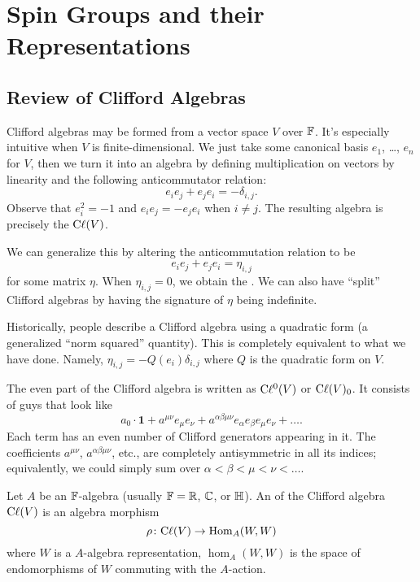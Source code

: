 \chapter{Spin Groups and their Representations}

\section{Review of Clifford Algebras}

\M
Clifford algebras may be formed from a vector space $V$ over $\mathbb{F}$. It's
especially intuitive when $V$ is finite-dimensional. We just take some
canonical basis $e_{1}$, \dots, $e_{n}$ for $V$, then we turn it into an
algebra by defining multiplication on vectors by linearity and the
following anticommutator relation:
\begin{equation}
e_{i}e_{j} + e_{j}e_{i} = -\delta_{i,j}.
\end{equation}
Observe that $e_{i}^{2}=-1$ and $e_{i}e_{j}=-e_{j}e_{i}$ when $i\neq j$.
The resulting algebra is precisely the  $\mathrm{C}\ell(V)$.

We can generalize this by altering the anticommutation relation to be
\begin{equation}
e_{i}e_{j} + e_{j}e_{i} = \eta_{i,j}
\end{equation}
for some matrix $\eta$. When $\eta_{i,j}=0$, we obtain the
. We can also have ``split'' Clifford algebras
by having the signature of $\eta$ being indefinite.

\begin{remark}
Historically, people describe a Clifford algebra using a quadratic form
(a generalized ``norm squared'' quantity). This is completely equivalent
to what we have done. Namely, $\eta_{i,j}=-Q(e_{i})\delta_{i,j}$ where
$Q$ is the quadratic form on $V$.
\end{remark}

The even part of the Clifford algebra is written as $\mathrm{C}\ell^{0}(V)$ or
$\mathrm{C}\ell(V)_{0}$. It consists of guys that look like
\[ a_{0}\cdot\mathbf{1} + a^{\mu\nu}e_{\mu}e_{\nu} + a^{\alpha\beta\mu\nu}e_{\alpha}e_{\beta}e_{\mu}e_{\nu}+\dots.\]
Each term has an even number of Clifford generators appearing in it. The
coefficients $a^{\mu\nu}$, $a^{\alpha\beta\mu\nu}$, etc., are completely
antisymmetric in all its indices; equivalently, we could simply sum over
$\alpha<\beta<\mu<\nu<\dots$. 

\begin{definition}
Let $A$ be an $\mathbb{F}$-algebra (usually $\mathbb{F}=\mathbb{R}$, $\mathbb{C}$, or $\mathbb{H}$). An
 of the Clifford algebra $\mathrm{C}\ell(V)$ is an algebra morphism
\[ \rho\colon\mathrm{C}\ell(V)\to\operatorname{Hom}_{A}(W, W) \]
where $W$ is a $A$-algebra representation, $\hom_{A}(W, W)$ is the space
of endomorphisms of $W$ commuting with the $A$-action.
\end{definition}

